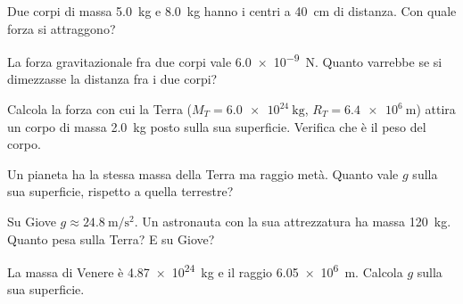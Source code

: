 \begin{esercizio}
Due corpi di massa \SI{5,0}{\kilo\gram} e \SI{8,0}{\kilo\gram} hanno i centri a \SI{40}{\centi\metre} di distanza. Con quale forza si attraggono?\\
\end{esercizio}

\begin{esercizio}
La forza gravitazionale fra due corpi vale \SI{6,0e-9}{\newton}. Quanto varrebbe se si dimezzasse la distanza fra i due corpi?\\
\end{esercizio}

\begin{esercizio}
Calcola la forza con cui la Terra ($M_T = \SI{6,0e24}{\kilo\gram}$, $R_T = \SI{6,4e6}{\metre}$) attira un corpo di massa \SI{2,0}{\kilo\gram} posto sulla sua superficie. Verifica che è il peso del corpo.\\
\end{esercizio}

\begin{esercizio}
Un pianeta ha la stessa massa della Terra ma raggio metà. Quanto vale $g$ sulla sua superficie, rispetto a quella terrestre?\\
\end{esercizio}

\begin{esercizio}
Su Giove $g \approx \SI{24,8}{\metre\per\second\squared}$. Un astronauta con la sua attrezzatura ha massa \SI{120}{\kilo\gram}. Quanto pesa sulla Terra? E su Giove?\\
\end{esercizio}

\begin{esercizio}
La massa di Venere è \SI{4,87e24}{\kilo\gram} e il raggio \SI{6,05e6}{\metre}. Calcola $g$ sulla sua superficie.\\
\end{esercizio}

